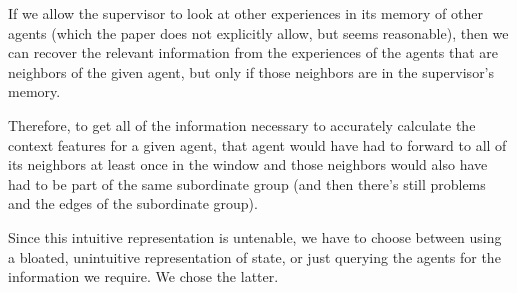 \documentclass[letterpaper]{article}
\begin{document}
If we allow the supervisor to look at other experiences in its memory of other agents (which the paper does not explicitly allow, but seems reasonable), then we can recover the relevant information from the experiences of the agents that are neighbors of the given agent, but only if those neighbors are in the supervisor’s memory.

Therefore, to get all of the information necessary to accurately calculate the context features for a given agent, that agent would have had to forward to all of its neighbors at least once in the window and those neighbors would also have had to be part of the same subordinate group (and then there’s still problems and the edges of the subordinate group).

Since this intuitive representation is untenable, we have to choose between using a bloated, unintuitive representation of state, or just querying the agents for the information we require.  We chose the latter.
\end{document}
